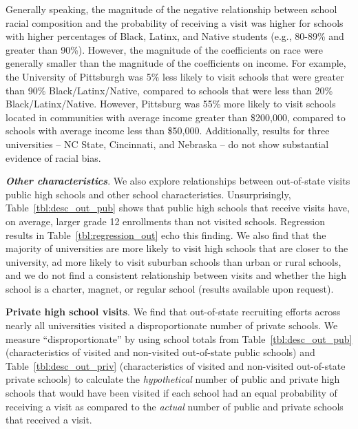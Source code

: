 \documentclass[twoside]{article}
\begin{document}

Generally speaking, the magnitude of the negative relationship between school racial composition and the probability of receiving a visit was higher for schools with higher percentages of Black, Latinx, and Native students (e.g., 80-89\% and greater than 90\%). However, the magnitude of the coefficients on race were generally smaller than the magnitude of the coefficients on income. For example, the University of Pittsburgh was 5\% less likely to visit schools that were greater than 90\% Black/Latinx/Native, compared to schools that were less than 20\% Black/Latinx/Native. However, Pittsburg was 55\% more likely to visit schools located in communities with average income greater than \$200,000, compared to schools with average income less than \$50,000. Additionally, results for three universities -- NC State, Cincinnati, and Nebraska -- do not show substantial evidence of racial bias.

\textbf{\textit{Other characteristics}}. We also explore relationships between out-of-state visits public high schools and other school characteristics. Unsurprisingly, Table~\ref{tbl:desc_out_pub} shows that public high schools that receive visits have, on average, larger grade 12 enrollments than not visited schools. Regression results in Table~\ref{tbl:regression_out} echo this finding. We also find that the majority of universities are more likely to visit high schools that are closer to the university, ad more likely to visit suburban schools than urban or rural schools, and we do not find a consistent relationship between visits and whether the high school is a charter, magnet, or regular school (results available upon request).


\textbf{Private high school visits}. We find that out-of-state recruiting efforts across nearly all universities visited a disproportionate number of private schools. We measure ``disproportionate'' by using school totals from Table~\ref{tbl:desc_out_pub} (characteristics of visited and non-visited out-of-state public schools) and Table~\ref{tbl:desc_out_priv} (characteristics of visited and non-visited out-of-state private schools) to calculate the \textit{hypothetical} number of public and private high schools that would have been visited if each school had an equal probability of receiving a visit as compared to the \textit{actual} number of public and private schools that received a visit.
\end{document}
